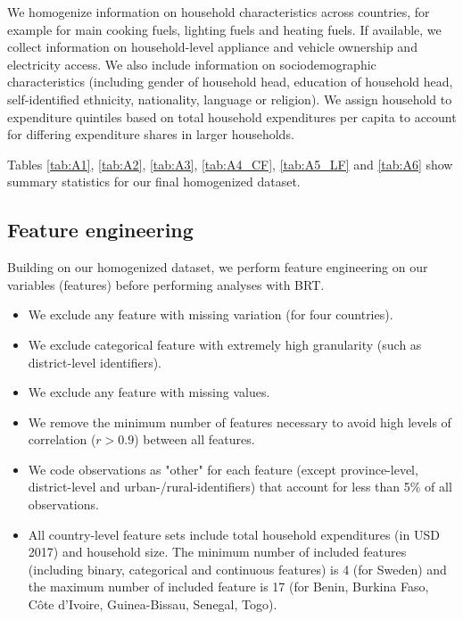 \documentclass[12pt, a4paper]{article}
\begin{document}
We homogenize information on household characteristics across countries, for example for main cooking fuels, lighting fuels and heating fuels. If available, we collect information on household-level appliance and vehicle ownership and electricity access. We also include information on sociodemographic characteristics (including gender of household head, education of household head, self-identified ethnicity, nationality, language or religion).
We assign household to expenditure quintiles based on total household expenditures per capita to account for differing expenditure shares in larger households. 

Tables \ref{tab:A1}, \ref{tab:A2}, \ref{tab:A3}, \ref{tab:A4_CF}, \ref{tab:A5_LF} and \ref{tab:A6} show summary statistics for our final homogenized dataset. 


\subsection{Feature engineering} \label{sec:featureengineering}

Building on our homogenized dataset, we perform feature engineering on our variables (features) before performing analyses with BRT.

\begin{itemize}
    \item We exclude any feature with missing variation (for four countries).
    \item We exclude categorical feature with extremely high granularity (such as district-level identifiers).
    \item We exclude any feature with missing values.
    \item We remove the minimum number of features necessary to avoid high levels of correlation ($r>0.9$) between all features.
    \item We code observations as "other" for each feature (except province-level, district-level and urban-/rural-identifiers) that account for less than 5\% of all observations.
    \item All country-level feature sets include total household expenditures (in USD 2017) and household size. The minimum number of included features (including binary, categorical and continuous features) is 4 (for Sweden) and the maximum number of included feature is 17 (for Benin, Burkina Faso, Côte d'Ivoire, Guinea-Bissau, Senegal, Togo).
\end{itemize}
\end{document}
